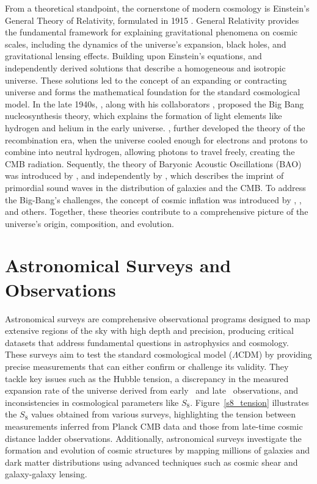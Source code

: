 From a theoretical standpoint, the cornerstone of modern cosmology is 
Einstein's General Theory of Relativity, formulated in 1915 \citep{1915SPAW.......844E}. General Relativity provides the fundamental framework for explaining gravitational phenomena on cosmic scales, including the dynamics of the universe's expansion, black holes, and gravitational lensing effects. Building upon Einstein's equations, \citet{1922ZPhy...10..377F} and \citet{1931MNRAS..91..483L} independently derived solutions that describe a homogeneous and isotropic universe. These solutions led to the concept of an expanding or contracting universe and forms the mathematical foundation for the standard cosmological model. In the late 1940s, \citet{1948Natur.162..680G}, along with his collaborators \citet{1948Natur.162..774A}, proposed the Big Bang nucleosynthesis theory, which explains the formation of light elements like hydrogen and helium in the early universe. 
\citet{1968ApJ...153....1P}, \citet{1969Ap&SS...4..301Z} further developed the theory of the recombination era, when the universe cooled enough for electrons and protons to combine into neutral hydrogen, allowing photons to travel freely, creating the CMB radiation. Sequently, the theory of Baryonic Acoustic Oscillations (BAO) was introduced by \citet{1970Ap&SS...7....3S}, and independently by \citet{1970ApJ...162..815P}, which describes the imprint of primordial sound waves in the distribution of galaxies and the CMB. To address the Big-Bang's challenges, the concept of cosmic inflation was introduced by \citet{1981PhRvD..23..347G}, \citet{1982PhLB..108..389L}, and others. Together, these theories contribute to a comprehensive picture of the universe's origin, composition, and evolution.

\section{Astronomical Surveys and Observations}
Astronomical surveys are comprehensive observational programs designed to map extensive regions of the sky with high depth and precision, producing critical datasets that address fundamental questions in astrophysics and cosmology. These surveys aim to test the standard cosmological model ($\Lambda$CDM) by providing precise measurements that can either confirm or challenge its validity. They tackle key issues such as the Hubble tension, a discrepancy in the measured expansion rate of the universe derived from early~\citep{2016A&A...594A..13P} and late~\citep{2019ApJ...876...85R} observations, and inconsistencies in cosmological parameters like $S_8$. Figure~\ref{s8_tension} illustrates the $S_8$ values obtained from various surveys, highlighting the tension between measurements inferred from Planck CMB data and those from late-time cosmic distance ladder observations. Additionally, astronomical surveys investigate the formation and evolution of cosmic structures by mapping millions of galaxies and dark matter distributions using advanced techniques such as cosmic shear and galaxy-galaxy lensing\citep{2013MNRAS.432.1544M, 2022PhRvD.105b3520A}.

